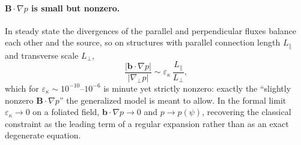 \documentclass[english]{article}
\newcommand{\bB}{\mathbf{B}}
\newcommand{\bb}{\mathbf{b}}
\newcommand{\gradperp}{\nabla_{\!\perp}}
\begin{document}
\paragraph{$\bB\cdot\nabla p$ is small but nonzero.}
In steady state the divergences of the parallel and perpendicular fluxes balance each other and the
source, so on structures with parallel connection length $L_\parallel$ and transverse scale
$L_\perp$,
\begin{equation}
\frac{|\bb\cdot\nabla p|}{|\gradperp p|}
\sim\varepsilon_\kappa\,\frac{L_\parallel}{L_\perp},
\label{eq:Bdotgradp_estimate}
\end{equation}
which for $\varepsilon_\kappa\sim10^{-10}$--$10^{-6}$ is minute yet strictly nonzero: exactly the
``slightly nonzero $\bB\cdot\nabla p$'' the generalized model is meant to allow. In the formal
limit $\varepsilon_\kappa\rightarrow0$ on a foliated field, $\bb\cdot\nabla p\rightarrow0$ and
$p\rightarrow p(\psi)$, recovering the classical constraint as the leading term of a regular
expansion rather than as an exact degenerate equation.
\end{document}
